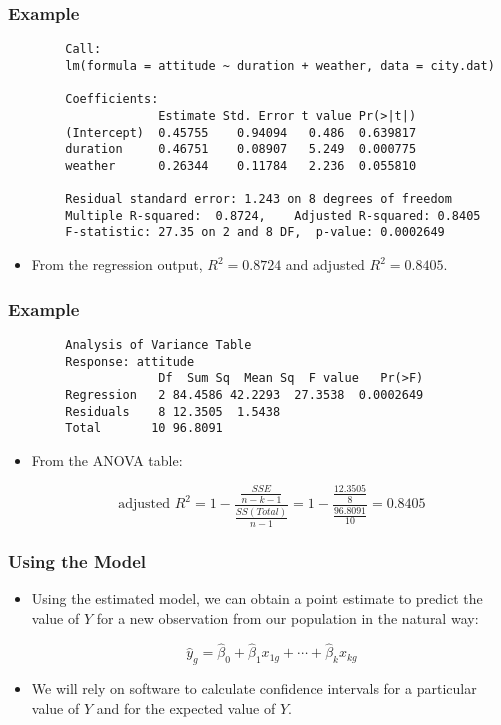 \documentclass[14pt]{beamer}
\begin{document}
\begin{frame}[fragile]
	\frametitle{Example}
		{\footnotesize
	\begin{verbatim}
		Call:
		lm(formula = attitude ~ duration + weather, data = city.dat)
		
		Coefficients:
		             Estimate Std. Error t value Pr(>|t|)
		(Intercept)  0.45755    0.94094   0.486  0.639817
		duration     0.46751    0.08907   5.249  0.000775
		weather      0.26344    0.11784   2.236  0.055810
		
		Residual standard error: 1.243 on 8 degrees of freedom
		Multiple R-squared:  0.8724,    Adjusted R-squared: 0.8405
		F-statistic: 27.35 on 2 and 8 DF,  p-value: 0.0002649
	\end{verbatim}
}
	\begin{itemize}[label={\color{blue}$\blacktriangleright$}]
		\item From the regression output, $R^2 = 0.8724$ and adjusted $R^2 = 0.8405$.
	\end{itemize}
	
\end{frame}
\begin{frame}[fragile]
	\frametitle{Example}
	
	{\small
		\begin{verbatim}
		Analysis of Variance Table
		Response: attitude
		             Df  Sum Sq  Mean Sq  F value   Pr(>F)
		Regression   2 84.4586 42.2293  27.3538  0.0002649
		Residuals    8 12.3505  1.5438
		Total       10 96.8091
	\end{verbatim}
}
	
	\begin{itemize}[label={\color{blue}$\blacktriangleright$}]
		\item From the ANOVA table:
		
		\[
		\text{adjusted }R^2 = 1 - \frac{\frac{SSE}{n-k-1}}{\frac{SS(Total)}{n-1}} = 1 - \frac{\frac{12.3505}{8}}{\frac{96.8091}{10}} = 0.8405
		\]
	\end{itemize}
	
\end{frame}
\begin{frame}
	\frametitle{Using the Model}
	
	\begin{itemize}[label={\color{blue}$\blacktriangleright$}]
		\item Using the estimated model, we can obtain a point estimate to predict the value of $Y$ for a new observation from our population in the natural way:
		
		\[
		\hat{y}_g = \hat{\beta}_0 + \hat{\beta}_1x_{1g} + \cdots + \hat{\beta}_kx_{kg}
		\]
		
		\item We will rely on software to calculate confidence intervals for a particular value of $Y$ and for the expected value of $Y$.
	\end{itemize}
	
\end{frame}
\end{document}
